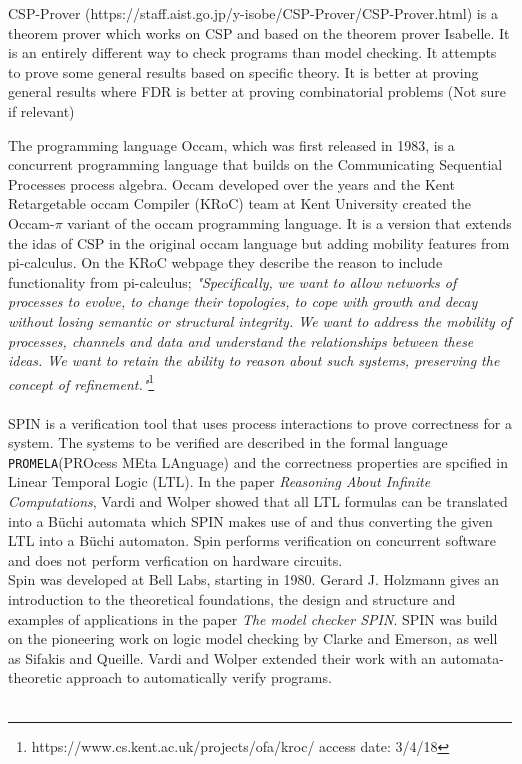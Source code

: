 \documentclass[a4paper]{report}
\begin{document}
CSP-Prover\cite{Isobe2005} (https://staff.aist.go.jp/y-isobe/CSP-Prover/CSP-Prover.html) is a theorem prover which works on CSP and based on the theorem prover Isabelle. It is an entirely different way to check programs than model checking. It attempts to prove some general results based on specific theory. It is better at proving general results where FDR is better at proving combinatorial problems (Not sure if relevant)


The programming language Occam, which was first released in 1983, is a concurrent programming language that builds on the Communicating Sequential Processes process algebra. Occam developed over the years and the Kent Retargetable occam Compiler (KRoC) team at Kent University created the Occam-$\pi$ variant of the occam programming language. It is a version that extends the idas of CSP in the original occam language but adding mobility features from pi-calculus. On the KRoC webpage they describe the reason to include functionality from pi-calculus; \textit{"Specifically, we want to allow networks of processes to evolve, to change their topologies, to cope with growth and decay without losing semantic or structural integrity. We want to address the mobility of processes, channels and data and understand the relationships between these ideas. We want to retain the ability to reason about such systems, preserving the concept of refinement."}\footnote{https://www.cs.kent.ac.uk/projects/ofa/kroc/ access date: 3/4/18}\\\\

SPIN\cite{spin} is a verification tool that uses process interactions to prove correctness for a system. The systems to be verified are described in the formal language \texttt{PROMELA}(PROcess MEta LAnguage)\cite{Holzmann1991} and the correctness properties are spcified in Linear Temporal Logic (LTL)\cite{Pnueli1977}. In the paper \textit{Reasoning About Infinite Computations}\cite{Vardi1994}, Vardi and Wolper showed that all LTL formulas can be translated into a B\"uchi automata which SPIN makes use of and thus converting the given LTL into a B\"uchi automaton. Spin performs verification on concurrent software and does not perform verfication on hardware circuits. \\
Spin was developed at Bell Labs, starting in 1980. Gerard J. Holzmann gives an introduction to the theoretical foundations, the design and structure and examples of applications in the paper \textit{The model checker SPIN}\cite{Holzmann1997}. SPIN was build on the pioneering work on logic model checking by Clarke and Emerson\cite{Clarke1981}, as well as Sifakis and Queille\cite{Queille1982}. Vardi and Wolper extended their work with an automata-theoretic approach to automatically verify programs\cite{Vardi1986}.\\\\
\end{document}
